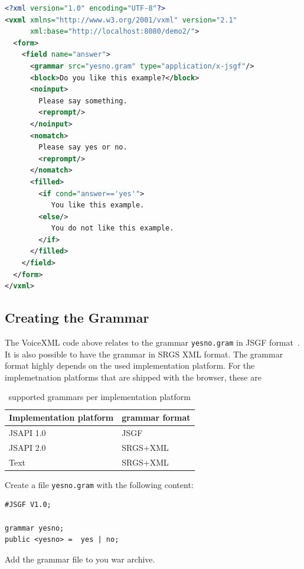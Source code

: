 \documentclass[11pt,a4paper]{book}
\begin{document}
\begin{lstlisting}[language=XML]
<?xml version="1.0" encoding="UTF-8"?> 
<vxml xmlns="http://www.w3.org/2001/vxml" version="2.1"
      xml:base="http://localhost:8080/demo2/">
  <form>
    <field name="answer">
      <grammar src="yesno.gram" type="application/x-jsgf"/>
      <block>Do you like this example?</block>
      <noinput>
        Please say something.
        <reprompt/>
      </noinput>
      <nomatch>
        Please say yes or no.
        <reprompt/>
      </nomatch>
      <filled>
        <if cond="answer=='yes'">
           You like this example.
        <else/>
           You do not like this example.
        </if>
      </filled>
    </field>
  </form>
</vxml>
\end{lstlisting}

\subsection{Creating the Grammar}
\label{sec:creating-grammar}

The VoiceXML code above relates to the grammar \texttt{yesno.gram} in JSGF
format~\cite{w3c:2000:jsgf}.
It is also possible to have the grammar in SRGS XML format. The grammar format
highly depends on the used implementation platform. For the implemetnation
platforms that are shipped with the browser, these are

\begin{table}
\begin{center}
\begin{tabular}{|l|l|}
\hline
Implementation platform & grammar format \\
\hline
\hline
JSAPI 1.0 & JSGF \\
\hline
JSAPI 2.0 & SRGS+XML \\
\hline
Text & SRGS+XML \\
\hline
\end{tabular}
\end{center}
\caption{supported grammars per implementation platform}
\end{table}


Create a file \texttt{yesno.gram} with the following content:

\begin{lstlisting}
#JSGF V1.0;

grammar yesno;
public <yesno> =  yes | no;
\end{lstlisting}

Add the grammar file to you war archive.
\end{document}
